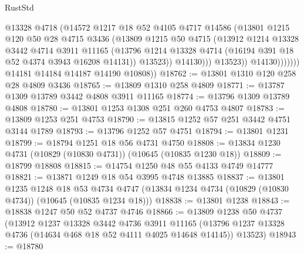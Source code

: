 \begin{lexlean}{RustStd}
\begin{coremodule}
                            @13328
                            @4718
                            (@14572
                              @1217
                              @18
                              @52
                              @4105
                              @4717
                              @14586
                              (@13801
                                @1215
                                @120
                                @50
                                @28
                                @4715
                                @3436
                                (@13809
                                  @1215
                                  @50
                                  @4715
                                  (@13912
                                    @1214
                                    @13328
                                    @3442
                                    @4714
                                    @3911
                                    @11165
                                    (@13796
                                      @1214
                                      @13328
                                      @4714
                                      (@16194 @391 @18 @52 @4374 @3943 @16208 @14131))
                                    @13523))
                                @14130)))
                          @13523))
                      @14130)))))))
        @14181
        @14184
        @14187
        @14190
        @10808))
@18762 := @13801 @1310 @120 @258 @28 @4809 @3436
@18765 := @13809 @1310 @258 @4809
@18771 := @13787 @1309 @13789 @3442 @4808 @3911 @11165
@18774 := @13796 @1309 @13789 @4808
@18780 := @13801 @1253 @1308 @251 @260 @4753 @4807
@18783 := @13809 @1253 @251 @4753
@18790 := @13815 @1252 @57 @251 @3442 @4751 @3144 @1789
@18793 := @13796 @1252 @57 @4751
@18794 := @13801 @1231
@18799 := @18794 @1251 @18 @56 @4731 @4750
@18808 := @13834 @1230 @4731 (@10829 (@10830 @4731)) (@10645 (@10835 @1230 @18))
@18809 := @18799 @18808
@18815 := @14754 @1250 @48 @55 @4133 @4749 @14777
@18821 := @13871 @1249 @18 @54 @3995 @4748 @13885
@18837 := @13801
    @1235
    @1248
    @18
    @53
    @4734
    @4747
    (@13834 @1234 @4734 (@10829 (@10830 @4734)) (@10645 (@10835 @1234 @18)))
@18838 := @13801 @1238
@18843 := @18838 @1247 @50 @52 @4737 @4746
@18866 := @13809
    @1238
    @50
    @4737
    (@13912
      @1237
      @13328
      @3442
      @4736
      @3911
      @11165
      (@13796 @1237 @13328 @4736 (@14634 @468 @18 @52 @4111 @4025 @14648 @14145))
      @13523)
@18943 := @18780

\end{coremodule}
\end{lexlean}
